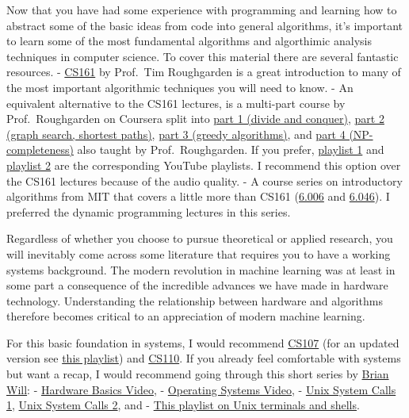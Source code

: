 Now that you have had some experience with programming and learning how
to abstract some of the basic ideas from code into general algorithms,
it's important to learn some of the most fundamental algorithms and
algorthimic analysis techniques in computer science. To cover this
material there are several fantastic resources. -
\href{https://www.youtube.com/watch?v=hbJMUzZtJgk\&list=PLyhSTP3Z5_mZ8krUa2JsvL7V755ogHgkK}{CS161}
by Prof.~Tim Roughgarden is a great introduction to many of the most
important algorithmic techniques you will need to know. - An equivalent
alternative to the CS161 lectures, is a multi-part course by
Prof.~Roughgarden on Coursera split into
\href{https://www.coursera.org/learn/algorithms-divide-conquer}{part 1
(divide and conquer)},
\href{https://www.coursera.org/learn/algorithms-graphs-data-structures}{part
2 (graph search, shortest paths)},
\href{https://www.coursera.org/learn/algorithms-greedy}{part 3 (greedy
algorithms)}, and
\href{https://www.coursera.org/learn/algorithms-npcomplete}{part 4
(NP-completeness)} also taught by Prof.~Roughgarden. If you prefer,
\href{https://www.youtube.com/playlist?list=PLXFMmlk03Dt7Q0xr1PIAriY5623cKiH7V}{playlist
1} and
\href{https://www.youtube.com/playlist?list=PLXFMmlk03Dt5EMI2s2WQBsLsZl7A5HEK6}{playlist
2} are the corresponding YouTube playlists. I recommend this option over
the CS161 lectures because of the audio quality. - A course series on
introductory algorithms from MIT that covers a little more than CS161
(\href{https://ocw.mit.edu/courses/electrical-engineering-and-computer-science/6-006-introduction-to-algorithms-spring-2020/index.htm}{6.006}
and
\href{https://ocw.mit.edu/courses/electrical-engineering-and-computer-science/6-046j-design-and-analysis-of-algorithms-spring-2015/index.htm}{6.046}).
I preferred the dynamic programming lectures in this series.

Regardless of whether you choose to pursue theoretical or applied
research, you will inevitably come across some literature that requires
you to have a working systems background. The modern revolution in
machine learning was at least in some part a consequence of the
incredible advances we have made in hardware technology. Understanding
the relationship between hardware and algorithms therefore becomes
critical to an appreciation of modern machine learning.

For this basic foundation in systems, I would recommend
\href{https://www.youtube.com/playlist?list=PL9D558D49CA734A02}{CS107}
(for an updated version see
\href{https://www.youtube.com/playlist?list=PLoCMsyE1cvdWivlV-39KKsBKUX-4DvraN}{this
playlist}) and
\href{https://www.youtube.com/playlist?list=PLu77E6J7s6Ko3Ft4XcOX1yKW6iX3eEFqS}{CS110}.
If you already feel comfortable with systems but want a recap, I would
recommend going through this short series by
\href{https://www.youtube.com/channel/UCseUQK4kC3x2x543nHtGpzw}{Brian
Will}: - \href{https://www.youtube.com/watch?v=9-KUm9YpPm0}{Hardware
Basics Video}, -
\href{https://www.youtube.com/watch?v=9GDX-IyZ_C8}{Operating Systems
Video}, - \href{https://youtu.be/xHu7qI1gDPA}{Unix System Calls 1},
\href{https://youtu.be/2DrjQBL5FMU}{Unix System Calls 2}, and -
\href{https://www.youtube.com/playlist?list=PLFAC320731F539902}{This
playlist on Unix terminals and shells}.
